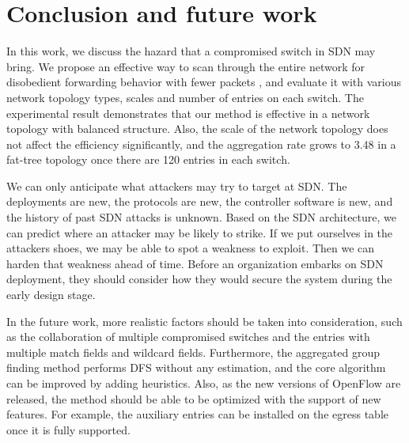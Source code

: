 \chapter{Conclusion and future work}
\label{conclusion}
In this work, we discuss the hazard that a compromised switch in SDN may bring. We propose an effective way to scan through the entire network for disobedient forwarding behavior with fewer packets , and evaluate it with various network topology types, scales and number of entries on each switch. The experimental result demonstrates that our method is effective in a network topology with balanced structure. Also, the scale of the network topology does not affect the efficiency significantly, and the aggregation rate grows to 3.48 in a fat-tree topology once there are 120 entries in each switch. 

We can only anticipate what attackers may try to target at SDN. The deployments are new, the protocols are new, the controller software is new, and the history of past SDN attacks is unknown. Based on the SDN architecture, we can predict where an attacker may be likely to strike. If we put ourselves in the attacker\textquotesingle s shoes, we may be able to spot a weakness to exploit. Then we can harden that weakness ahead of time. Before an organization embarks on SDN deployment, they should consider how they would secure the system during the early design stage. 

In the future work, more realistic factors should be taken into consideration, such as the collaboration of multiple compromised switches and the entries with multiple match fields and wildcard fields. Furthermore, the aggregated group finding method performs DFS without any estimation, and the core algorithm can be improved by adding heuristics. Also, as the new versions of OpenFlow are released, the method should be able to be optimized with the support of new features. For example, the auxiliary entries can be installed on the egress table once it is fully supported.